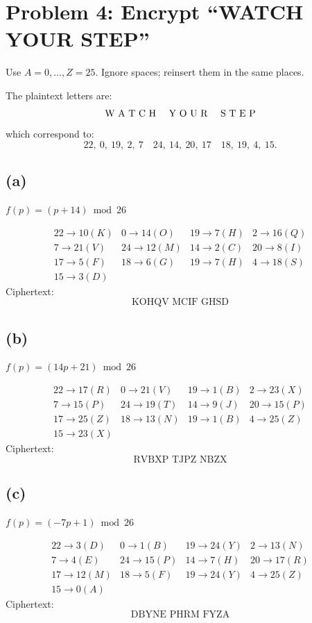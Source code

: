 \section*{Problem 4: Encrypt “WATCH YOUR STEP”}

Use \(A=0,\ldots,Z=25\). Ignore spaces; reinsert them in the same places.

The plaintext letters are:
\[
\text{W A T C H \quad Y O U R \quad S T E P}
\]
which correspond to:
\[
22,\ 0,\ 19,\ 2,\ 7 \quad 24,\ 14,\ 20,\ 17 \quad 18,\ 19,\ 4,\ 15.
\]

\subsection*{(a) } \(f(p) = (p + 14) \bmod 26\)

\[
\begin{array}{llll}
22 \to 10(K) & 0 \to 14(O) & 19 \to 7(H) & 2 \to 16(Q)\\
7 \to 21(V)  & 24 \to 12(M) & 14 \to 2(C) & 20 \to 8(I)\\
17 \to 5(F)  & 18 \to 6(G)  & 19 \to 7(H) & 4 \to 18(S)\\
15 \to 3(D)
\end{array}
\]
Ciphertext:
\[
\boxed{\text{KOHQV MCIF GHSD}}
\]

\subsection*{(b) } \(f(p) = (14p + 21) \bmod 26\)

\[
\begin{array}{llll}
22 \to 17(R) & 0 \to 21(V) & 19 \to 1(B) & 2 \to 23(X)\\
7 \to 15(P)  & 24 \to 19(T) & 14 \to 9(J) & 20 \to 15(P)\\
17 \to 25(Z) & 18 \to 13(N) & 19 \to 1(B) & 4 \to 25(Z)\\
15 \to 23(X)
\end{array}
\]
Ciphertext:
\[
\boxed{\text{RVBXP TJPZ NBZX}}
\]

\subsection*{(c) } \(f(p) = (-7p + 1) \bmod 26\)

\[
\begin{array}{llll}
22 \to 3(D) & 0 \to 1(B) & 19 \to 24(Y) & 2 \to 13(N)\\
7 \to 4(E)  & 24 \to 15(P) & 14 \to 7(H) & 20 \to 17(R)\\
17 \to 12(M) & 18 \to 5(F) & 19 \to 24(Y) & 4 \to 25(Z)\\
15 \to 0(A)
\end{array}
\]
Ciphertext:
\[
\boxed{\text{DBYNE PHRM FYZA}}
\]
